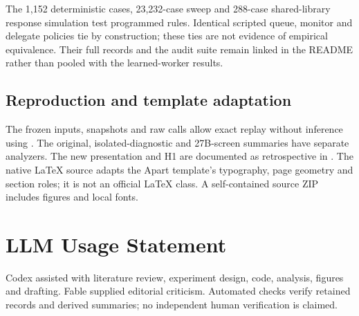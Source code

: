 \documentclass[11pt,letterpaper]{article}
\begin{document}
The 1,152 deterministic cases, 23,232-case sweep and 288-case shared-library response simulation test programmed rules. Identical scripted queue, monitor and delegate policies tie by construction; these ties are not evidence of empirical equivalence. Their full records and the audit suite remain linked in the README rather than pooled with the learned-worker results.

\subsection{Reproduction and template adaptation}
The frozen inputs, snapshots and raw calls allow exact replay without inference using . The original, isolated-diagnostic and 27B-screen summaries have separate analyzers. The new presentation and H1 are documented as retrospective in . The native LaTeX source adapts the Apart template's typography, page geometry and section roles; it is not an official LaTeX class. A self-contained source ZIP includes figures and local fonts.

\section*{LLM Usage Statement}
Codex assisted with literature review, experiment design, code, analysis, figures and drafting. Fable supplied editorial criticism. Automated checks verify retained records and derived summaries; no independent human verification is claimed.
\end{document}
